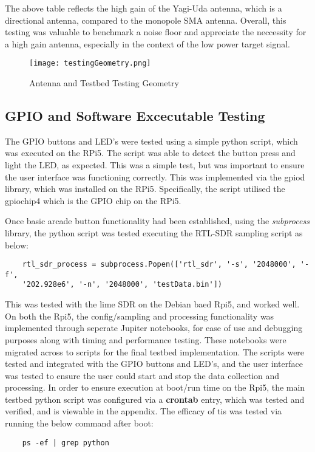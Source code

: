 The above table reflects the high gain of the Yagi-Uda antenna, which is a directional antenna, compared to the monopole SMA antenna. Overall, this testing was valuable to benchmark a noise floor and appreciate the neccessity for a high gain antenna, especially in the context of the low power target signal.

\begin{figure}[h!]
    \centering
    \texttt{[image: testingGeometry.png]}
    \caption{Antenna and Testbed Testing Geometry}
    \label{fig:antennaGeometry}
\end{figure}


\subsection{GPIO and Software Excecutable Testing \label{sec:gpioTesting}}

The GPIO buttons and LED's were tested using a simple python script, which was executed on the RPi5. The script was able to detect the button press and light the LED, as expected. This was a simple test, but was important to ensure the user interface was functioning correctly.   This was implemented via the gpiod library, which was installed on the RPi5. Specifically, the script utilised the gpiochip4 which is the GPIO chip on the RPi5. 

\par \vspace{0.5cm}
\noindent
Once basic arcade button functionality had been established, using the \textit{subprocess} library, the python script was tested executing the RTL-SDR sampling script as below:

\begin{verbatim}
    rtl_sdr_process = subprocess.Popen(['rtl_sdr', '-s', '2048000', '-f', 
    '202.928e6', '-n', '2048000', 'testData.bin'])
\end{verbatim}

\noindent This was tested with the lime SDR on the Debian baed Rpi5, and worked well. On both the Rpi5, the config/sampling and processing functionality was implemented through seperate Jupiter notebooks, for ease of use and debugging purposes along with timing and performance testing. These notebooks were migrated across to scripts for the final testbed implementation. The scripts were tested and integrated with the GPIO buttons and LED's, and the user interface was tested to ensure the user could start and stop the data collection and processing. In order to ensure execution at boot/run time on the Rpi5, the main testbed python script was configured via a \textbf{crontab} entry, which was tested and verified, and is viewable in the appendix. The efficacy of tis was tested via running the below command after boot:
\begin{verbatim}
    ps -ef | grep python
\end{verbatim}

